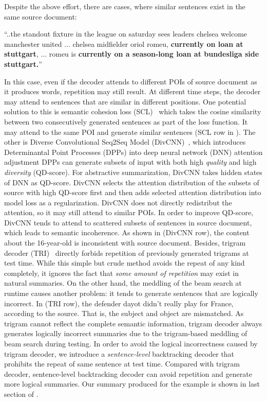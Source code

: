 Despite the above effort, there are cases, where similar sentences 
exist in the same source document:
\begin{example}
\label{ex:repeatsrc}
\small{``..the standout fixture in the league on saturday sees leaders 
	   chelsea welcome manchester united ... chelsea midfielder oriol romeu, 
\textbf{currently on loan at stuttgart}, ... romeu is 
\textbf{currently on a season-long loan at bundesliga side stuttgart.}''} 
\end{example}

In this case, even if the decoder attends to different POIs of 
source document as it produces words, repetition may still result.  
At different time steps, 
the decoder may attend 
to sentences that are similar in different positions.
One potential solution to this is semantic cohesion loss (SCL)~\citep{elikyilmazBHC18}
which takes the cosine similarity between two consecutively generated sentences
as part of the loss function. It may attend to the same POI
and generate similar sentences (SCL row in ).  
The other is Diverse Convolutional Seq2Seq
Model (DivCNN)~\citep{DivC2C19}, 
which introduces Determinantal Point Processes (DPPs) \citep{DPPs11} into deep neural network (DNN) attention adjustment
DPPs can generate subsets of input with both high {\em quality} and high {\em diversity} (QD-score).
For abstractive summarization, DivCNN takes hidden states of DNN as QD-score.
DivCNN selects the attention distribution of the subsets of source with high QD-score
first and then adds selected attention distribution into model loss as a regularization.
DivCNN does not directly redistribut the attention,
so it may still attend to similar POIs.
In order to improve QD-score, DivCNN tends to attend to scattered subsets of sentences in source document,
which leads to semantic incoherence. 
As shown in  (DivCNN row),
the content about the 16-year-old 
is inconsistent with source document.
Besides, trigram decoder (TRI)~\citep{PaulusXS17} 
directly forbids repetition of previously generated trigrams at test time. 
While this simple but crude method avoids the repeat of any kind
completely, 
it ignores the fact that \textit{some amount of repetition} may exist
in natural summaries.  
On the other hand, the meddling of the beam search at runtime causes another problem: 
it tends to generate sentences that are logically incorrect. 
In  (TRI row), the defender dayot didn't
really play for France, according to the source.
That is, the subject and object are mismatched.
As trigram cannot reflect the complete semantic information, 
trigram decoder always generates logically incorrect summaries 
due to the trigram-based meddling of beam search 
during testing. 
In order to avoid the logical incorrectness caused by trigram decoder,
we introduce  a {\em sentence-level} backtracking decoder
that prohibits the repeat of same sentence at test time. 
Compared with trigram decoder, 
sentence-level backtracking decoder can avoid repetition and generate more logical summaries. 
Our summary produced for the example is shown in last section of 
.

